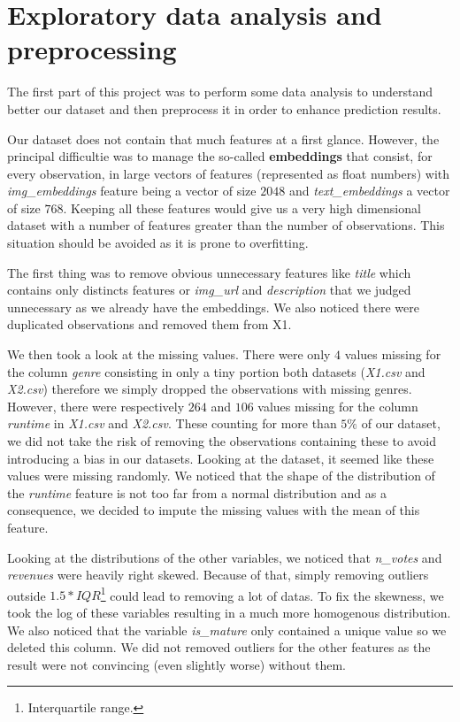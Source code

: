 \section{Exploratory data analysis and preprocessing}

The first part of this project was to perform some data analysis to understand better our dataset and then preprocess it in order to enhance prediction results.

Our dataset does not contain that much features at a first glance. However, the principal difficultie was to manage the so-called \textbf{embeddings} that consist, for every observation, in large vectors of features (represented as float numbers) with \textit{img\_embeddings} feature being a vector of size $2048$ and \textit{text\_embeddings} a vector of size $768$. Keeping all these features would give us a very high dimensional dataset with a number of features greater than the number of observations. This situation should be avoided as it is prone to overfitting.

The first thing was to remove obvious unnecessary features like \textit{title} which contains only distincts features or \textit{img\_url} and \textit{description} that we judged unnecessary as we already have the embeddings. We also noticed there were duplicated observations and removed them from X1.

We then took a look at the missing values. There were only $4$ values missing for the column \textit{genre} consisting in only a tiny portion both datasets (\textit{X1.csv} and \textit{X2.csv}) therefore we simply dropped the observations with missing genres. However, there were respectively $264$ and $106$ values missing for the column \textit{runtime} in \textit{X1.csv} and \textit{X2.csv}. These counting for more than $5\%$ of our dataset, we did not take the risk of removing the observations containing these to avoid introducing a bias in our datasets. Looking at the dataset, it seemed like these values were missing randomly. We noticed that the shape of the distribution of the \textit{runtime} feature is not too far from a normal distribution and as a consequence, we decided to impute the missing values with the mean of this feature.

Looking at the distributions of the other variables, we noticed that \textit{n\_votes} and \textit{revenues} were heavily right skewed. Because of that, simply removing outliers outside $1.5 * IQR$\footnote{Interquartile range.} could lead to removing a lot of datas. To fix the skewness, we took the log of these variables resulting in a much more homogenous distribution. We also noticed that the variable \textit{is\_mature} only contained a unique value so we deleted this column. We did not removed outliers for the other features as the result were not convincing (even slightly worse) without them.

